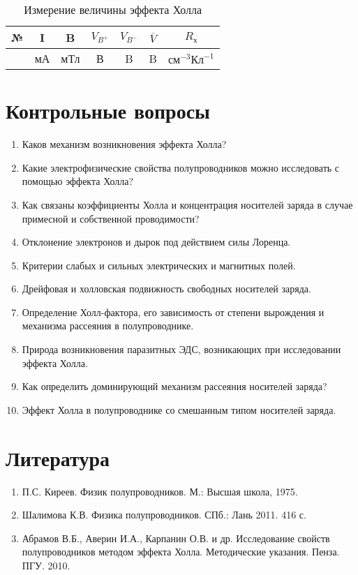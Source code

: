 \begin{table}[h!]
\caption{Измерение величины эффекта Холла}
\begin{center}
\begin{tabular}{c|c|c|c|c|c|c}
№ & I & B & $V_{B^{+}}$ & $V_{B^{-}}$ & $\overline{V}$ & $R_{\text{х}}$ \\
\hline
& мА & мТл & В & B & B & $\text{см}^{-3}\text{Кл}^{-1}$ \\
\hline
\end{tabular}
\end{center}
\end{table}

\section{Контрольные вопросы}

\begin{enumerate}
\item Каков механизм возникновения эффекта Холла?
\item Какие электрофизические свойства полупроводников можно исследовать с помощью эффекта Холла?
\item Как связаны коэффициенты Холла и концентрация носителей заряда в случае примесной и собственной проводимости?
\item Отклонение электронов и дырок под действием силы Лоренца.
\item Критерии слабых и сильных электрических и магнитных полей.
\item Дрейфовая и холловская подвижность свободных носителей заряда.
\item Определение Холл-фактора, его зависимость от степени вырождения и механизма рассеяния в полупроводнике.
\item Природа возникновения паразитных ЭДС, возникающих при исследовании эффекта Холла.
\item Как определить доминирующий механизм рассеяния носителей заряда?
\item Эффект Холла в полупроводнике со смешанным типом носителей заряда.
\end{enumerate}

\section{Литература}
\begin{enumerate}
\item П.С. Киреев. Физик полупроводников. М.: Высшая школа, 1975.
\item Шалимова К.В. Физика полупроводников. СПб.: Лань 2011. 416 с.
\item Абрамов В.Б., Аверин И.А., Карпанин О.В. и др. Исследование свойств полупроводников методом эффекта Холла. Методические указания. Пенза. ПГУ. 2010.
\end{enumerate}